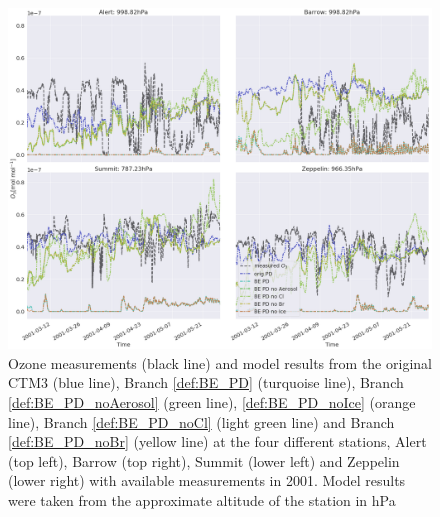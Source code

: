 \begin{figure}
    \centering
    \includegraphics[width = \linewidth]{Chapter6_Results/images/ozone_stationComp_2001/ozone_2001_testRemoveHetReacts.png}
    \caption{Ozone measurements (black line) and model results from the original CTM3 (blue line), Branch \ref{def:BE_PD} (turquoise line), Branch \ref{def:BE_PD_noAerosol} (green line), \ref{def:BE_PD_noIce} (orange line), Branch \ref{def:BE_PD_noCl} (light green line) and Branch \ref{def:BE_PD_noBr} (yellow line) at the four different stations, Alert (top left), Barrow (top right), Summit (lower left) and Zeppelin (lower right) with available measurements in 2001. Model results were taken from the approximate altitude of the station in hPa}
    \label{fig:test_RemoveHetReacts}
\end{figure}